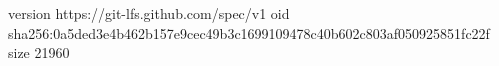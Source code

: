 version https://git-lfs.github.com/spec/v1
oid sha256:0a5ded3e4b462b157e9cec49b3c1699109478c40b602c803af050925851fc22f
size 21960
